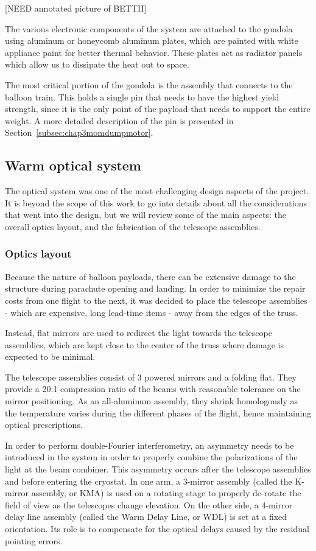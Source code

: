 [NEED annotated picture of BETTII]

The various electronic components of the system are attached to the gondola using aluminum or honeycomb aluminum plates, which are painted with white appliance paint for better thermal behavior. These plates act as radiator panels which allow us to dissipate the heat out to space.

The most critical portion of the gondola is the assembly that connects to the balloon train. This holds a single pin that needs to have the highest yield strength, since it is the only point of the payload that needs to support the entire weight. A more detailed description of the pin is presented in Section~\ref{subsec:chap3momdumpmotor}.



\subsection{Warm optical system}

The optical system was one of the most challenging design aspects of the project. It is beyond the scope of this work to go into details about all the considerations that went into the design, but we will review some of the main aspects: the overall optics layout, and the fabrication of the telescope assemblies.

\subsubsection{Optics layout}
Because the nature of balloon payloads, there can be extensive damage to the structure during parachute opening and landing. In order to minimize the repair costs from one flight to the next, it was decided to place the telescope assemblies - which are expensive, long lead-time items - away from the edges of the truss. 

Instead, flat mirrors are used to redirect the light towards the telescope assemblies, which are kept close to the center of the truss where damage is expected to be minimal. 

The telescope assemblies consist of 3 powered mirrors and a folding flat. They provide a 20:1 compression ratio of the beams with reasonable tolerance on the mirror positioning. As an all-aluminum assembly, they shrink homologously as the temperature varies during the different phases of the flight, hence maintaining optical prescriptions. 

In order to perform double-Fourier interferometry, an asymmetry needs to be introduced in the system in order to properly combine the polarizations of the light at the beam combiner. This asymmetry occurs after the telescope assemblies and before entering the cryostat. In one arm, a 3-mirror assembly (called the K-mirror assembly, or KMA) is used on a rotating stage to properly de-rotate the field of view as the telescopes change elevation. On the other side, a 4-mirror delay line assembly (called the Warm Delay Line, or WDL) is set at a fixed orientation. Its role is to compensate for the optical delays caused by the residual pointing errors. 

